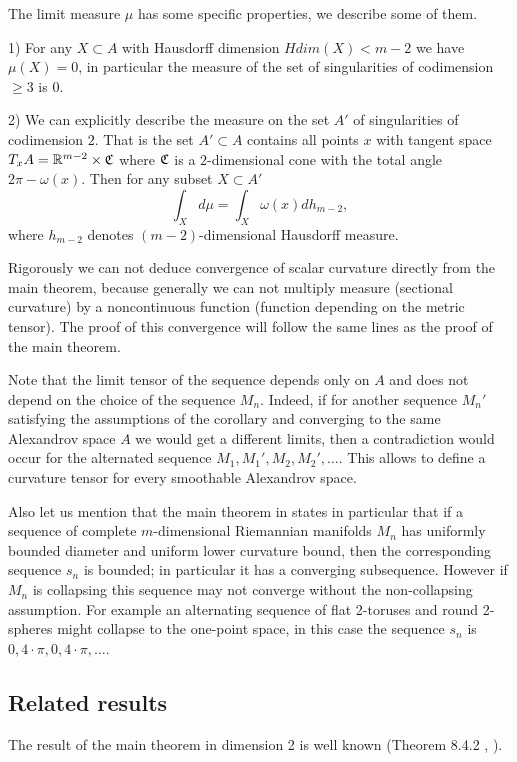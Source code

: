\documentclass[a4paper,10pt]{article}
\begin{document}
The limit measure $\mu$ has some specific properties,
we describe some of them.

1) For any $X\subset A$ with Hausdorff dimension
$Hdim(X)< m-2$ we have
$\mu(X)=0$, in particular the measure of the set of singularities
of codimension $\ge 3$ is $0$.

2) We can explicitly  describe the measure 
on the set $A'$ of singularities
of codimension $2$. That is the set $A'\subset A$
contains all points $x$ with tangent space
$T_xA=\mathbb{R}^{m-2}\times \mathfrak{C}$
where $\mathfrak{C}$ is a $2$-dimensional cone
with the total angle $2\pi-\omega(x)$.
Then for any subset $X\subset A'$
 $$\int_Xd\mu=\int_X
\omega(x)d h_{m-2}, $$ where $h_{m-2}$ denotes $(m-2)$-dimensional Hausdorff measure.


Rigorously we can not deduce convergence of scalar curvature
directly from the main theorem, because generally we can not multiply
 measure (sectional curvature) by a noncontinuous 
 function (function  depending on the metric tensor). The proof
 of this convergence will follow the same lines as the proof
 of the main theorem.

Note that the limit tensor of the sequence depends only on $A$ and does not depend on the choice of the sequence $M_n$.
Indeed, if for another sequence $M_n'$ satisfying the assumptions of the corollary and converging to the same Alexandrov space $A$ we would get a different limits, 
then a contradiction would occur for the alternated sequence $M_1,M_1',M_2,M_2',\dots$. This allows to define a curvature
tensor for every smoothable Alexandrov space. 

Also let us mention that the main theorem in \cite{petrunin-SC} states in particular that if a sequence of complete $m$-dimensional Riemannian  manifolds $M_n$ has uniformly bounded diameter and uniform lower curvature bound, then 
the corresponding sequence $s_n$ is bounded; in particular it has a converging subsequence.
However if $M_n$ is collapsing this sequence may not converge
without the non-collapsing assumption.
For example an alternating sequence of flat 2-toruses and round 2-spheres might collapse to the one-point space, in this case the sequence $s_n$ is $0,4\cdot\pi,0,4\cdot\pi,\dots$.

\subsection{Related results}
The result of the main theorem in dimension 2 is well
 known (Theorem 8.4.2 \cite{Resh}, \cite{AZ} ).
\end{document}
